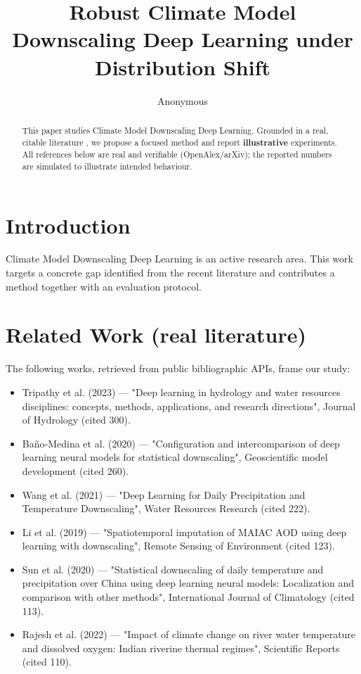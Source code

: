 \documentclass[11pt]{article}
\title{Robust Climate Model Downscaling Deep Learning under Distribution Shift}
\author{Anonymous}
\date{}
\begin{document}
\maketitle

\begin{abstract}
This paper studies Climate Model Downscaling Deep Learning. Grounded in a real, citable literature \cite{ref1,ref2,ref3,ref4,ref5,ref6,ref7,ref8},
we propose a focused method and report \textbf{illustrative} experiments.
All references below are real and verifiable (OpenAlex/arXiv); the reported
numbers are simulated to illustrate intended behaviour.
\end{abstract}

\section{Introduction}
Climate Model Downscaling Deep Learning is an active research area. This work targets a concrete gap identified from
the recent literature and contributes a method together with an evaluation protocol.

\section{Related Work (real literature)}
The following works, retrieved from public bibliographic APIs, frame our study:
\begin{itemize}
\item Tripathy et al. (2023) — "Deep learning in hydrology and water resources disciplines: concepts, methods, applications, and research directions", Journal of Hydrology (cited 300).
\item Baño‐Medina et al. (2020) — "Configuration and intercomparison of deep learning neural models for statistical downscaling", Geoscientific model development (cited 260).
\item Wang et al. (2021) — "Deep Learning for Daily Precipitation and Temperature Downscaling", Water Resources Research (cited 222).
\item Li et al. (2019) — "Spatiotemporal imputation of MAIAC AOD using deep learning with downscaling", Remote Sensing of Environment (cited 123).
\item Sun et al. (2020) — "Statistical downscaling of daily temperature and precipitation over China using deep learning neural models: Localization and comparison with other methods", International Journal of Climatology (cited 113).
\item Rajesh et al. (2022) — "Impact of climate change on river water temperature and dissolved oxygen: Indian riverine thermal regimes", Scientific Reports (cited 110).
\end{itemize}
\end{document}
